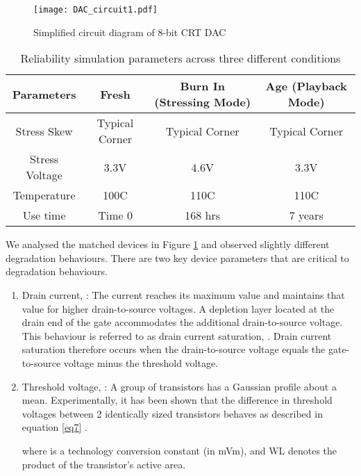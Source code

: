 \documentclass[11pt,a4paper]{article}
\begin{document}
\begin{figure}[t]
\centering
\texttt{[image: DAC\_circuit1.pdf]}
\caption{Simplified circuit diagram of 8-bit CRT DAC}
\label{figure6}
\end{figure}
\begin{table}[t]
\centering
\caption{Reliability simulation parameters across three different conditions}
\label{table1}
\begin{tabular}{|c|c|c|c|} \hline
Parameters & Fresh & Burn In (Stressing Mode) & Age (Playback Mode)\\
\hline
Stress Skew & Typical Corner & Typical Corner & Typical Corner \\
Stress Voltage & 3.3V & 4.6V & 3.3V \\
Temperature & 100C & 110C & 110C\\
Use time & Time 0 & 168 hrs & 7 years \\
\hline
\end{tabular}

\end{table}

We analysed the matched devices in Figure \ref{figure6} and observed slightly different degradation behaviours. There are two key device parameters that are critical to degradation behaviours.

\begin{enumerate}
\item Drain current, : The current reaches its maximum value and maintains that value for higher drain-to-source voltages. A depletion layer located at the drain end of the gate accommodates the additional drain-to-source voltage. This behaviour is referred to as drain current saturation, . Drain current saturation therefore occurs when the drain-to-source voltage equals the gate-to-source voltage minus the threshold voltage. 
\item Threshold voltage, : A group of transistors has a Gaussian profile about a mean. Experimentally, it has been shown that the difference in threshold voltages between 2 identically sized transistors behaves as described in equation \ref{eq7} \cite{Schroder}.



where  is a technology conversion constant (in mVm), and WL denotes the product of the transistor's active area.

\end{enumerate}
\end{document}
